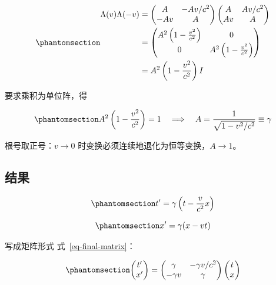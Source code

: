 \documentclass[
  chinese,
  a4paper,
  UTF8,
  12pt,
  oneside,
  openany]{ctexbook}
\theoremstyle{plain}
\theoremstyle{plain}
\theoremstyle{plain}
\theoremstyle{definition}
\theoremstyle{plain}
\theoremstyle{plain}
\theoremstyle{remark}
\begin{document}
\begin{equation}\protect\phantomsection\label{eq-boost-product}{
\begin{aligned}
\Lambda(v) \Lambda(-v) &= \begin{pmatrix} A & -Av/c^2 \\ -Av & A \end{pmatrix} \begin{pmatrix} A & Av/c^2 \\ Av & A \end{pmatrix} \\
&= \begin{pmatrix} A^2 \left(1 - \frac{v^2}{c^2}\right) & 0 \\ 0 & A^2 \left(1 - \frac{v^2}{c^2}\right) \end{pmatrix} \\
&= A^2 \left(1 - \frac{v^2}{c^2}\right) I
\end{aligned}
}\end{equation}

要求乘积为单位阵，得

\begin{equation}\protect\phantomsection\label{eq-gamma-def}{
A^{2}\left(1 - \frac{v^{2}}{c^{2}}\right) = 1
\quad \Longrightarrow \quad
A = \frac{1}{\sqrt{1 - v^{2}/c^{2}}} \equiv \gamma
}\end{equation}

根号取正号：\(v \to 0\) 时变换必须连续地退化为恒等变换，\(A \to 1\)。

\subsection{结果}\label{ux7ed3ux679c-1}

\begin{equation}\protect\phantomsection\label{eq-final-t}{
t' = \gamma\left( t - \frac{v}{c^{2}}x \right)
}\end{equation}

\begin{equation}\protect\phantomsection\label{eq-final-x}{
x' = \gamma(x - vt)
}\end{equation}

写成矩阵形式 式~\ref{eq-final-matrix}：

\begin{equation}\protect\phantomsection\label{eq-final-matrix}{
\begin{pmatrix} t' \\ x' \end{pmatrix}
=
\begin{pmatrix} \gamma & -\gamma v/c^{2} \\ -\gamma v & \gamma \end{pmatrix}
\begin{pmatrix} t \\ x \end{pmatrix}
}\end{equation}
\end{document}

